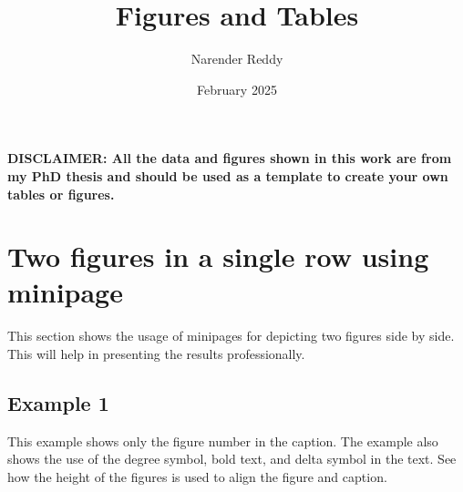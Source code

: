 \documentclass[11pt]{article}
\title{Figures and Tables}
\author{Narender Reddy}
\date{February 2025}
\begin{document}
\maketitle

\textbf{DISCLAIMER: All the data and figures shown in this work are from my PhD thesis and should be used as a template to create your own tables or figures.}

\section{Two figures in a single row using minipage}

This section shows the usage of minipages for depicting two figures side by side. This will help in presenting the results professionally. 


\subsection{Example 1}

This example shows only the figure number in the caption. The example also shows the use of the degree symbol, bold text, and delta symbol in the text. See how the height of the figures is used to align the figure and caption.

\vspace{0.5ex}
\end{document}
